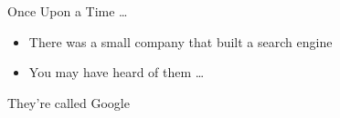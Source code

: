 \documentclass[aspectratio=169]{beamer}
\begin{document}
    {%
    \begin{frame}{Once Upon a Time \ldots{}}
        \begin{itemize}
            \item There was a small company that built a search engine
            \item You may have heard of them \ldots{}
        \end{itemize}
    \end{frame}
    }

    {%
    \begin{frame}
        \begin{titlebox}
            \centering
            {They're called Google}
        \end{titlebox}
    \end{frame}
    }
\end{document}
